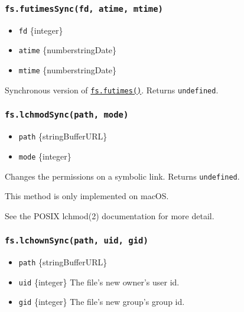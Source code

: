 \subsubsection{\texorpdfstring{\texttt{fs.futimesSync(fd,\ atime,\ mtime)}}{fs.futimesSync(fd, atime, mtime)}}\label{fs.futimessyncfd-atime-mtime}

\begin{itemize}
\tightlist
\item
  \texttt{fd} \{integer\}
\item
  \texttt{atime} \{number\textbar string\textbar Date\}
\item
  \texttt{mtime} \{number\textbar string\textbar Date\}
\end{itemize}

Synchronous version of
\hyperref[fsfutimesfd-atime-mtime-callback]{\texttt{fs.futimes()}}.
Returns \texttt{undefined}.

\subsubsection{\texorpdfstring{\texttt{fs.lchmodSync(path,\ mode)}}{fs.lchmodSync(path, mode)}}\label{fs.lchmodsyncpath-mode}

\begin{itemize}
\tightlist
\item
  \texttt{path} \{string\textbar Buffer\textbar URL\}
\item
  \texttt{mode} \{integer\}
\end{itemize}

Changes the permissions on a symbolic link. Returns \texttt{undefined}.

This method is only implemented on macOS.

See the POSIX lchmod(2) documentation for more detail.

\subsubsection{\texorpdfstring{\texttt{fs.lchownSync(path,\ uid,\ gid)}}{fs.lchownSync(path, uid, gid)}}\label{fs.lchownsyncpath-uid-gid}

\begin{itemize}
\tightlist
\item
  \texttt{path} \{string\textbar Buffer\textbar URL\}
\item
  \texttt{uid} \{integer\} The file's new owner's user id.
\item
  \texttt{gid} \{integer\} The file's new group's group id.
\end{itemize}

